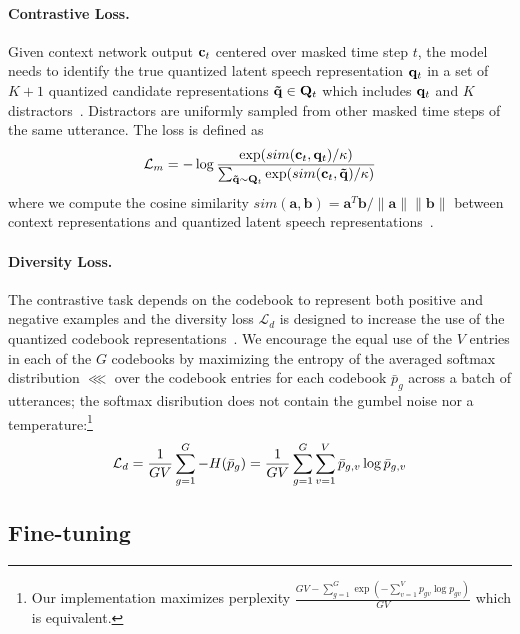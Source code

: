 \documentclass{article}
\begin{document}
\paragraph{Contrastive Loss.}
Given context network output $\mathbf{c}_t$ centered over masked time step $t$, the model needs to identify the true quantized latent speech representation $\mathbf{q}_t$ in a set of $K+1$ quantized candidate representations $\mathbf{\tilde{q}} \in \mathbf{Q}_t$ which includes $\mathbf{q}_t$ and $K$ distractors~\citep{gutmann2010aistats,oord2018cpc}.
Distractors are uniformly sampled from other masked time steps of the same utterance. The loss is defined as
\begin{equation}
    \mathcal{L}_{m}{} = -\log \frac{\exp(sim(\mathbf{c}_t, \mathbf{q}_t)/\kappa)}{\sum_{\mathbf{\tilde{q}} \sim \mathbf{Q}_t} \exp(sim(\mathbf{c}_t, \mathbf{\tilde{q}})/\kappa)}
\label{eq:mlm}
\end{equation}
where we compute the cosine similarity $sim(\mathbf{a},\mathbf{b}) = \mathbf{a}^{T} \mathbf{b} / \|\mathbf{a}\| \|\mathbf{b}\|$ between context representations and quantized latent speech representations~\citep{he2019momentum,chen2020simple}.


\paragraph{Diversity Loss.}
The contrastive task depends on the codebook to represent both positive and negative examples and the diversity loss $\mathcal{L}_d$ is designed to increase the use of the quantized codebook representations~\citep{dieleman2018challenge}.
We encourage the equal use of the $V$ entries in each of the $G$ codebooks by maximizing the entropy of the averaged softmax distribution $\lll$ over the codebook entries for each codebook $\bar{p}_{g}$ across a batch of utterances; the softmax disribution does not contain the gumbel noise nor a temperature:\footnote{Our implementation maximizes perplexity $\frac{GV - \sum_{g=1}^{G}\exp(-\sum_{v=1}^{V}p_{gv} \log{p_{gv}})}{GV}$ which is equivalent.}
\begin{equation}
    \mathcal{L}_{d}{} = \frac{1}{GV} \sum_{g=1}^{G} - H(\bar{p}_{g}) = \frac{1}{GV} \sum_{g=1}^{G} \sum_{v=1}^{V} \bar{p}_{g,v} \log{\bar{p}_{g,v}}
\end{equation}



\subsection{Fine-tuning}
\label{sec:train_finetune}
\end{document}
